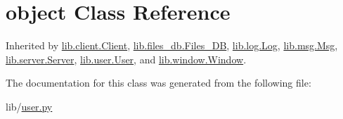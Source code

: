 \hypertarget{classobject}{}\section{object Class Reference}
\label{classobject}


Inherited by \hyperlink{classlib_1_1client_1_1_client}{lib.\+client.\+Client}, \hyperlink{classlib_1_1files__db_1_1_files___d_b}{lib.\+files\+\_\+db.\+Files\+\_\+\+DB}, \hyperlink{classlib_1_1log_1_1_log}{lib.\+log.\+Log}, \hyperlink{classlib_1_1msg_1_1_msg}{lib.\+msg.\+Msg}, \hyperlink{classlib_1_1server_1_1_server}{lib.\+server.\+Server}, \hyperlink{classlib_1_1user_1_1_user}{lib.\+user.\+User}, and \hyperlink{classlib_1_1window_1_1_window}{lib.\+window.\+Window}.



The documentation for this class was generated from the following file\+:\begin{DoxyCompactItemize}
\item 
lib/\hyperlink{user_8py}{user.\+py}\end{DoxyCompactItemize}
